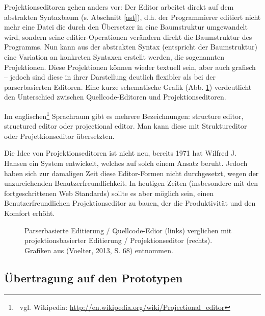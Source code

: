  
Projektionseditoren gehen anders vor: Der Editor arbeitet direkt auf dem abstrakten Syntaxbaum (s. Abschnitt \ref{ast}), d.h. der Programmierer editiert nicht mehr eine Datei die durch den Übersetzer in eine Baumstruktur umgewandelt wird, sondern seine editier-Operationen verändern direkt die Baumstruktur des Programms. \citep[S.~68]{Voelter} Nun kann aus der abstrakten Syntax (entspricht der Baumstruktur) eine Variation an konkreten Syntaxen erstellt werden, die sogenannten Projektionen. Diese Projektionen können wieder textuell sein, aber auch grafisch -- jedoch sind diese in ihrer Darstellung deutlich flexibler als bei der parserbasierten Editoren. Eine kurze schematische Grafik (Abb. \ref{parserprojectional}) verdeutlicht den Unterschied zwischen Quellcode-Editoren und Projektionseditoren.

 
Im englischen\footnote{~vgl. Wikipedia: \url{http://en.wikipedia.org/wiki/Projectional\_editor}} Sprachraum gibt es mehrere Bezeichnungen: structure editor, structured editor oder projectional editor. Man kann diese mit Struktureditor oder Projetkionseditor übersetzten.

 
Die Idee von Projektionseditoren ist nicht neu, bereits 1971 hat Wilfred J. Hansen ein System entwickelt, welches auf solch einem Ansatz beruht. Jedoch haben sich zur damaligen Zeit diese Editor-Formen nicht durchgesetzt, wegen der unzureichenden Benutzerfreundlichkeit. \citep[S.~91]{Gomolka} In heutigen Zeiten (insbesondere mit den fortgeschrittenen Web Standards) sollte es aber möglich sein, einen Benutzerfreundlichen Projektionseditor zu bauen, der die Produktivität und den Komfort erhöht.

 
\begin{figure}[h!]
\centering
\advance\leftskip-2.5cm
\caption{ Parserbasierte Editierung / Quellcode-Edior (links) verglichen mit projektionsbasierter Editierung / Projektionseditor (rechts). Grafiken aus (Voelter, 2013, S. 68) entnommen. }\label{parserprojectional}
\end{figure}
 
\subsection{Übertragung auf den Prototypen}\label{}
 
